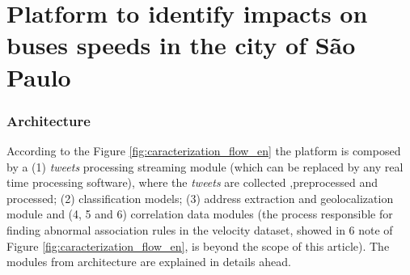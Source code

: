 \documentclass[runningheads]{llncs}
\begin{document}

\section{Platform to identify impacts on buses speeds in the city of São Paulo}

\subsubsection{Architecture}

According to the Figure \ref{fig:caracterization_flow_en} the platform is composed by a (1) \textit{tweets} processing streaming module (which can be replaced by any real time processing software), where the \textit{tweets} are collected ,preprocessed and processed; (2) classification models; (3) address extraction and geolocalization module and (4, 5 and 6) correlation data modules (the process responsible for finding abnormal association rules in the velocity dataset, showed in 6 note of Figure \ref{fig:caracterization_flow_en}, is beyond the scope of this article). The modules from architecture are explained in details ahead.
\end{document}
